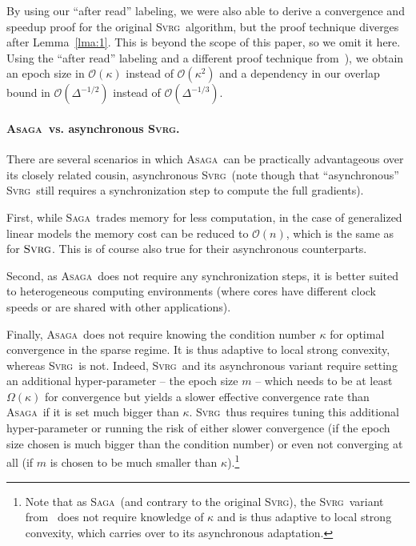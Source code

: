 \documentclass[twoside]{article}
\newcommand{\sparsity}{\Delta}
\newcommand{\ASAGA}{\textsc{Asaga}}
\newcommand{\SAGA}{\textsc{Saga}}
\newcommand{\SVRG}{\textsc{Svrg}}
\begin{document}
By using our ``after read'' labeling, we were also able to derive a convergence and speedup proof for the original \SVRG\ algorithm, but the proof technique diverges after Lemma~\ref{lma:1}. 
This is beyond the scope of this paper, so we omit it here. 
Using the ``after read'' labeling and a different proof technique from~\citet{mania}), we obtain an epoch size in $\mathcal{O}(\kappa)$ instead of $\mathcal{O}(\kappa^2)$ and a dependency in our overlap bound in $\mathcal{O}(\sparsity^{-1/2})$ instead of $\mathcal{O}(\sparsity^{-1/3})$.

\paragraph{\ASAGA\ vs. asynchronous \SVRG.}
There are several scenarios in which \ASAGA\ can be practically advantageous over its closely related cousin, asynchronous \SVRG\ (note though that ``asynchronous'' \SVRG\ still requires a synchronization step to compute the full gradients).

First, while \SAGA\ trades memory for less computation, in the case of generalized linear models the memory cost can be reduced to $\mathcal{O}(n)$, which is the same as for $\SVRG$.
This is of course also true for their asynchronous counterparts.

Second, as \ASAGA\ does not require any synchronization steps, it is better suited to heterogeneous computing environments (where cores have different clock speeds or are shared with other applications).

Finally, \ASAGA\ does not require knowing the condition number $\kappa$ for optimal convergence in the sparse regime.
It is thus adaptive to local strong convexity, whereas \SVRG\ is not.
Indeed, \SVRG\ and its asynchronous variant require setting an additional hyper-parameter -- the epoch size $m$ -- which needs to be at least $\Omega(\kappa)$ for convergence but yields a slower effective convergence rate than \ASAGA\ if it is set much bigger than $\kappa$.
\SVRG\ thus requires tuning this additional hyper-parameter or running the risk of either slower convergence (if the epoch size chosen is much bigger than the condition number) or even not converging at all (if $m$ is chosen to be much smaller than $\kappa$).\footnote{Note that as \SAGA\ (and contrary to the original \SVRG),  the \SVRG\ variant from~\citet{qsaga} does not require knowledge of $\kappa$ and is thus adaptive to local strong convexity, which carries over to its asynchronous adaptation.}
\end{document}
